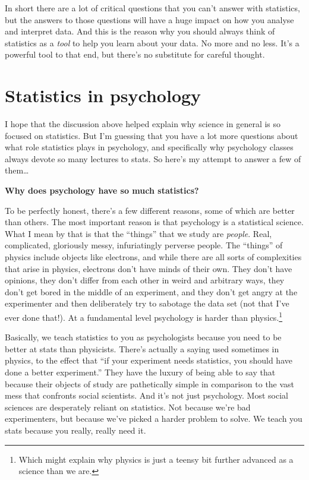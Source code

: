 \documentclass[
]{book}
\begin{document}
In short there are a lot of critical questions that you can't answer with statistics, but the answers to those questions will have a huge impact on how you analyse and interpret data. And this is the reason why you should always think of statistics as a \emph{tool} to help you learn about your data. No more and no less. It's a powerful tool to that end, but there's no substitute for careful thought.

\hypertarget{statistics-in-psychology}{%
\section{Statistics in psychology}\label{statistics-in-psychology}}

I hope that the discussion above helped explain why science in general is so focused on statistics. But I'm guessing that you have a lot more questions about what role statistics plays in psychology, and specifically why psychology classes always devote so many lectures to stats. So here's my attempt to answer a few of them\ldots{}

\textbf{Why does psychology have so much statistics?}

To be perfectly honest, there's a few different reasons, some of which are better than others. The most important reason is that psychology is a statistical science. What I mean by that is that the ``things'' that we study are \emph{people}. Real, complicated, gloriously messy, infuriatingly perverse people. The ``things'' of physics include objects like electrons, and while there are all sorts of complexities that arise in physics, electrons don't have minds of their own. They don't have opinions, they don't differ from each other in weird and arbitrary ways, they don't get bored in the middle of an experiment, and they don't get angry at the experimenter and then deliberately try to sabotage the data set (not that I've ever done that!). At a fundamental level psychology is harder than physics.\footnote{Which might explain why physics is just a teensy bit further advanced as a science than we are.}

Basically, we teach statistics to you as psychologists because you need to be better at stats than physicists. There's actually a saying used sometimes in physics, to the effect that ``if your experiment needs statistics, you should have done a better experiment.'' They have the luxury of being able to say that because their objects of study are pathetically simple in comparison to the vast mess that confronts social scientists. And it's not just psychology. Most social sciences are desperately reliant on statistics. Not because we're bad experimenters, but because we've picked a harder problem to solve. We teach you stats because you really, really need it.
\end{document}
